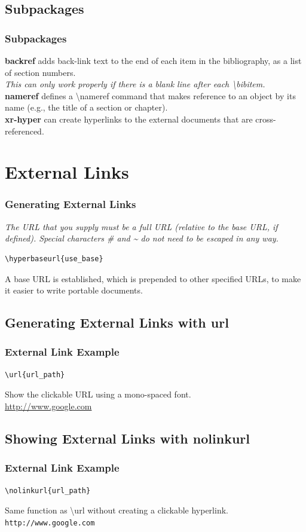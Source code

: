 \documentclass[10pt]{beamer}
\begin{document}
\subsection{Subpackages}
\begin{frame}[fragile]
\frametitle{Subpackages}
\textbf{backref} adds back-link text to the end of each item in the bibliography, as a list of section numbers.
\\[7pt]
\textit{\small{This can only work properly if there is a blank line after each \textbackslash bibitem.}}
\\[10pt]
\textbf{nameref} defines a \textbackslash nameref command that makes reference to an object by its name (e.g., the title of a section or chapter).
\\[10pt]
\textbf{xr-hyper} can create hyperlinks to the external documents that are cross-referenced.
\end{frame}

\section{External Links}
\begin{frame}[fragile]
\frametitle{Generating External Links}
\textit{The URL that you supply must be a full URL (relative to the base URL, if defined). Special characters \# and \~{} do not need to be escaped in any way.}
\begin{verbatim}\hyperbaseurl{use_base}
\end{verbatim}
A base URL is established, which is prepended to other specified URLs, to make it easier to write portable documents.
\end{frame}

\subsection{Generating External Links with url}
\begin{frame}[fragile]
\frametitle{External Link Example}
\begin{verbatim}\url{url_path}
\end{verbatim}
Show the clickable URL using a mono-spaced font.
\\[15pt]
\url{http://www.google.com}
\end{frame}

\subsection{Showing External Links with nolinkurl}
\begin{frame}[fragile]
\frametitle{External Link Example}
\begin{verbatim}\nolinkurl{url_path}
\end{verbatim}
Same function as \textbackslash url without creating a clickable hyperlink.
\\[15pt]
\nolinkurl{http://www.google.com}
\end{frame}
\end{document}
